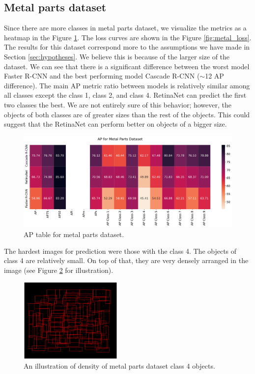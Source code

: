 \subsection*{Metal parts dataset}
Since there are more classes in metal parts dataset, we visualize the metrics
as a heatmap in the Figure \ref{fig:metal_ap}. The loss curves are shown in
the Figure \ref{fig:metal_loss}. The results for this dataset correspond more to
the assumptions we have made in Section \ref{sec:hypotheses}. We believe this is
because of the larger size of the dataset. We can see that there is a
significant difference between the worst model Faster R-CNN and the best
performing model Cascade R-CNN (\small$\sim$\normalsize12 AP difference). The
main AP metric ratio between models is relatively similar among all classes
except the class 1, class 2, and class 4. RetinaNet can predict the first two
classes the best. We are not entirely sure of this behavior; however, the
objects of both classes are of greater sizes than the rest of the objects. This
could suggest that the RetinaNet can perform better on objects of
a bigger size.

\begin{figure}[H]
	\includegraphics[width=\linewidth]{Sources/Figures/metal/metal_ap.png}
	\caption{AP table for metal parts dataset.}
	\label{fig:metal_ap}
\end{figure}

The hardest images for prediction were those with the class 4. The objects of
class 4 are relatively small. On top of that, they are very densely arranged in
the image (see Figure \ref{fig:metal_example} for illustration).

\begin{figure}[H]
	\centering
	\includegraphics[width=0.45\textwidth]{Sources/Figures/metal/example.png}
	\caption{An illustration of density of metal parts dataset class 4
		objects.}
	\label{fig:metal_example}
\end{figure}

